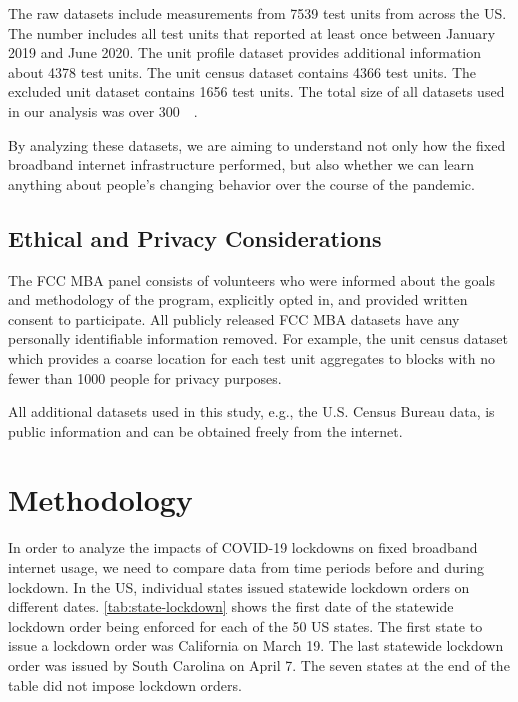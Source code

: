 \documentclass[conference,10pt]{IEEEtran}
\begin{document}
The raw datasets include measurements from 7539 test units from across the \gls{US}. The number includes all test units that reported at least once between January 2019 and June 2020. The unit profile dataset provides additional information about 4378 test units. The unit census dataset contains 4366 test units. The excluded unit dataset contains 1656 test units. The total size of all datasets used in our analysis was over \SI{300}{\giga\byte}.

By analyzing these datasets, we are aiming to understand not only how the fixed broadband internet infrastructure performed, but also whether we can learn anything about people's changing behavior over the course of the pandemic.

\subsection{Ethical and Privacy Considerations}\label{sec:ethical-and-privacy-considerations}

The \gls{FCC} \gls{MBA} panel consists of volunteers who were informed about the goals and methodology of the program, explicitly opted in, and provided written consent to participate. All publicly released \gls{FCC} \gls{MBA} datasets have any personally identifiable information removed. For example, the unit census dataset which provides a coarse location for each test unit aggregates to blocks with no fewer than 1000 people for privacy purposes.

All additional datasets used in this study, e.g., the U.S. Census Bureau data, is public information and can be obtained freely from the internet.

\section{Methodology}\label{sec:methodology}

In order to analyze the impacts of COVID-19 lockdowns on fixed broadband internet usage, we need to compare data from time periods before and during lockdown. In the \gls{US}, individual states issued statewide lockdown orders on different dates. \cref{tab:state-lockdown} shows the first date of the statewide lockdown order being enforced for each of the 50 \gls{US} states. The first state to issue a lockdown order was California on March 19. The last statewide lockdown order was issued by South Carolina on April 7. The seven states at the end of the table did not impose lockdown orders.
\end{document}
